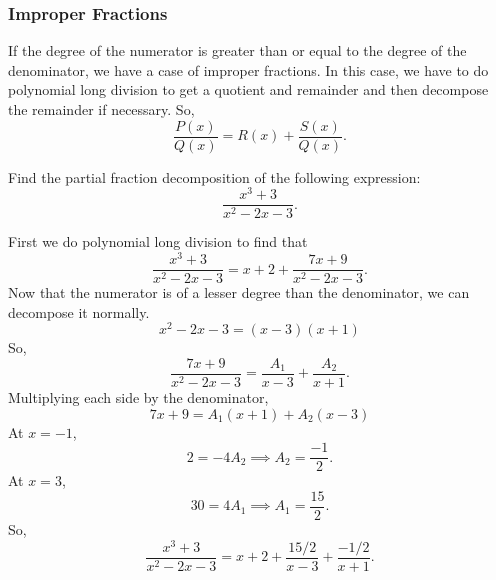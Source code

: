 \subsubsection{Improper Fractions}
\noindent
If the degree of the numerator is greater than or equal to the degree of the denominator, we have a case of improper fractions.
In this case, we have to do polynomial long division to get a quotient and remainder and then decompose the remainder if necessary.
So,
\begin{equation*}
	\frac{P(x)}{Q(x)} = R(x) + \frac{S(x)}{Q(x)}.
\end{equation*}

\begin{example}
	Find the partial fraction decomposition of the following expression:
	\begin{equation*}
		\frac{x^3+3}{x^2-2x-3}.
	\end{equation*}
\end{example}
\noindent
First we do polynomial long division to find that
\begin{equation*}
	\frac{x^3+3}{x^2-2x-3} = x + 2 + \frac{7x+9}{x^2-2x-3}.
\end{equation*}
Now that the numerator is of a lesser degree than the denominator, we can decompose it normally.
\begin{equation*}
	x^2-2x-3 = (x-3)(x+1)
\end{equation*}
So,
\begin{equation*}
	\frac{7x+9}{x^2-2x-3} = \frac{A_1}{x-3} + \frac{A_2}{x+1}.
\end{equation*}
Multiplying each side by the denominator,
\begin{equation*}
	7x+9 = A_1(x+1) + A_2(x-3)
\end{equation*}
At $x=-1$,
\begin{equation*}
	2 = -4A_2 \implies A_2 = \frac{-1}{2}.
\end{equation*}
At $x=3$,
\begin{equation*}
	30 = 4A_1 \implies A_1 = \frac{15}{2}.
\end{equation*}
So,
\begin{equation*}
	\frac{x^3+3}{x^2-2x-3} = x + 2 + \frac{15/2}{x-3} + \frac{-1/2}{x+1}.
\end{equation*}